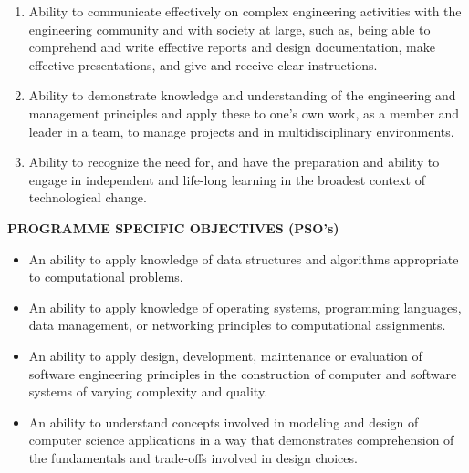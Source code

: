 \begin{spacing}{1.1}
\begin{enumerate}
\item Ability to communicate effectively on complex engineering activities with the engineering community and with society at large, such as, being able to comprehend and write effective reports and design documentation, make effective presentations, and give and receive clear instructions.

\item Ability to demonstrate knowledge and understanding of the engineering and management principles and apply these to one's own work, as a member and leader in a team, to manage projects and in multidisciplinary environments.

\item Ability to recognize the need for, and have the preparation and ability to engage in independent and life-long learning in the broadest context of technological change.
\end{enumerate}
\end{spacing}


\begin{center}
\textbf{\fontsize{15}{30}\selectfont PROGRAMME SPECIFIC OBJECTIVES (PSO's)}\\
\end{center}

\vspace{1em}

\begin{itemize}


\item    An ability to apply knowledge of data structures and algorithms appropriate to computational problems.
\item    An ability to apply knowledge of operating systems, programming languages, data management, or networking principles to computational assignments.
\item    An ability to apply design, development, maintenance or evaluation of software engineering principles in the construction of computer and software systems of varying complexity and quality. 
 \item   An ability to understand concepts involved in modeling and design of computer science applications in a way that demonstrates comprehension of the fundamentals and trade-offs involved in design choices.


\end{itemize}